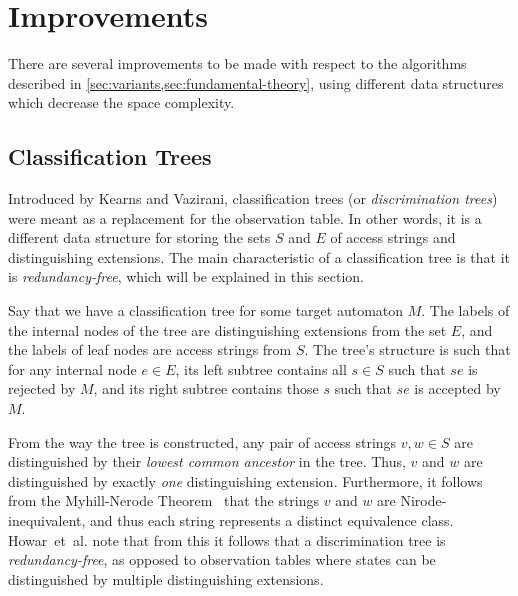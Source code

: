 \documentclass[multi,crop=false,class=article]{standalone}
\begin{document}
\section{Improvements}
\label{sec:improvements}
There are several improvements to be made with respect to the algorithms
described in \cref{sec:variants,sec:fundamental-theory}, using different data
structures which decrease the space complexity.

\subsection{Classification Trees}
\label{sec:classification-trees}
Introduced by Kearns and Vazirani\cite{Kearns94}, classification trees (or
\textit{discrimination trees}) were meant as a replacement for the observation
table. In other words, it is a different data
structure for storing the sets $S$ and $E$ of access strings and distinguishing
extensions. The main characteristic of a classification tree is that it is
\textit{redundancy-free}, which will be explained in this section.

Say that we have a classification tree for some target automaton $M$. The labels
of the internal nodes of the tree are distinguishing extensions from the set
$E$, and the labels of leaf nodes are access strings from $S$. The tree's
structure is such that for any internal node $e \in E$, its left subtree
contains all $s \in S$ such that $se$ is rejected by $M$, and its right subtree
contains those $s$ such that $se$ is accepted by $M$.

From the way the tree is constructed, any pair of access strings $v,w \in S$ are
distinguished by their \textit{lowest common ancestor} in the tree. Thus, $v$
and $w$ are distinguished by exactly \textit{one} distinguishing
extension. Furthermore, it follows from the Myhill-Nerode
Theorem~ that the strings $v$ and $w$ are
Nirode-inequivalent, and thus each string represents a distinct equivalence
class. Howar~et~al. note that from this it follows
that a discrimination tree is \textit{redundancy-free}, as opposed to
observation tables where states can be distinguished by multiple distinguishing
extensions\cite{Howar14}.
\end{document}
